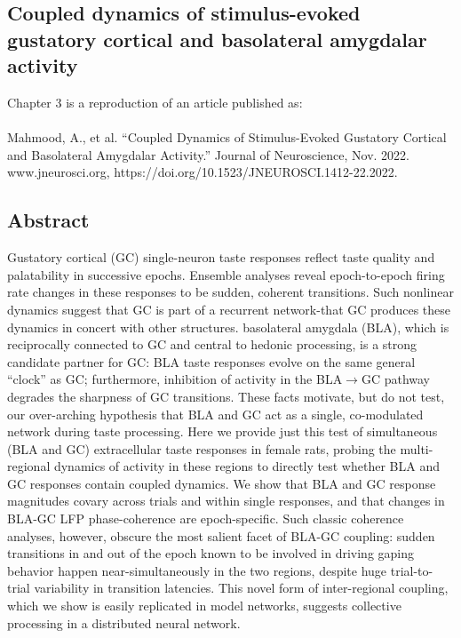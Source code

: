 \begin{refsection}

\chapter[Cortico-Amygdalar Dynamics in Taste Processing]{Coupled dynamics of stimulus-evoked gustatory cortical and basolateral amygdalar activity}

Chapter 3 is a reproduction of an article published as:\\\\
Mahmood, A., et al. “Coupled Dynamics of Stimulus-Evoked Gustatory Cortical and Basolateral Amygdalar Activity.” Journal of Neuroscience, Nov. 2022. www.jneurosci.org, https://doi.org/10.1523/JNEUROSCI.1412-22.2022.

\section{Abstract}
Gustatory cortical (GC) single-neuron taste responses reflect taste quality and palatability in successive epochs. Ensemble analyses reveal epoch-to-epoch firing rate changes in these responses to be sudden, coherent transitions. Such nonlinear dynamics suggest that GC is part of a recurrent network-that GC produces these dynamics in concert with other structures. basolateral amygdala (BLA), which is reciprocally connected to GC and central to hedonic processing, is a strong candidate partner for GC: BLA taste responses evolve on the same general “clock” as GC; furthermore, inhibition of activity in the BLA$\rightarrow$GC pathway degrades the sharpness of GC transitions. These facts motivate, but do not test, our over-arching hypothesis that BLA and GC act as a single, co-modulated network during taste processing. Here we provide just this test of simultaneous (BLA and GC) extracellular taste responses in female rats, probing the multi-regional dynamics of activity in these regions to directly test whether BLA and GC responses contain coupled dynamics. We show that BLA and GC response magnitudes covary across trials and within single responses, and that changes in BLA-GC LFP phase-coherence are epoch-specific. Such classic coherence analyses, however, obscure the most salient facet of BLA-GC coupling: sudden transitions in and out of the epoch known to be involved in driving gaping behavior happen near-simultaneously in the two regions, despite huge trial-to-trial variability in transition latencies. This novel form of inter-regional coupling, which we show is easily replicated in model networks, suggests collective processing in a distributed neural network.


\end{refsection}
